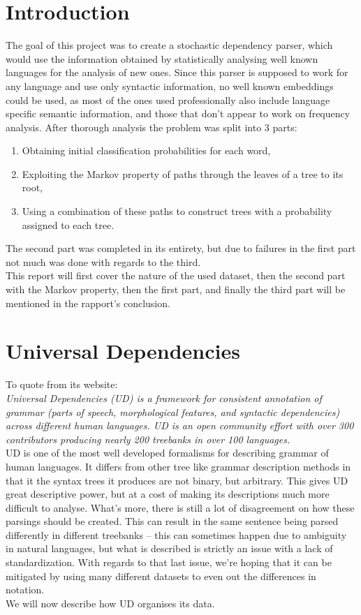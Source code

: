 \chapter{Introduction}
The goal of this project was to create a stochastic dependency parser, which would use the information obtained by statistically analysing well known languages for the analysis of new ones. Since this parser is supposed to work for any language and use only syntactic information, no well known embeddings could be used, as most of the ones used professionally also include language
specific semantic information, and those that don't appear to work on frequency analysis. After thorough analysis the problem was split into 3 parts:
\begin{enumerate}
    \item Obtaining initial classification probabilities for each word,
    \item Exploiting the Markov property of paths through the leaves of a tree to its root,
    \item Using a combination of these paths to construct trees with a probability assigned to each tree.
\end{enumerate}
The second part was completed in its entirety, but due to failures in the first part not much was done with regards to the third. \\
This report will first cover the nature of the used dataset, then the second part with the Markov property, then the first part, and finally the third part will be mentioned in the rapport's conclusion.

\chapter{Universal Dependencies}
To quote from its website:\\
\textit{Universal Dependencies (UD) is a framework for consistent annotation of grammar (parts of speech, morphological features, and syntactic dependencies) across different human languages. UD is an open community effort with over 300 contributors producing nearly 200 treebanks in over 100 languages. }\\
UD is one of the most well developed formalisms for describing grammar of human languages. It differs from other tree like grammar description methods in that it the syntax trees it produces are not binary, but arbitrary. 
This gives UD great descriptive power, but at a cost of making its descriptions much more difficult to analyse. 
What's more, there is still a lot of disagreement on how these parsings should be created. 
This can result in the same sentence being parsed differently in different treebanks -- this can sometimes happen due to ambiguity in natural languages, but what is described is strictly an issue with a lack of standardization.
With regards to that last issue, we're hoping that it can be mitigated by using many different datasets to even out the differences in notation.\\
We will now describe how UD organises its data.
